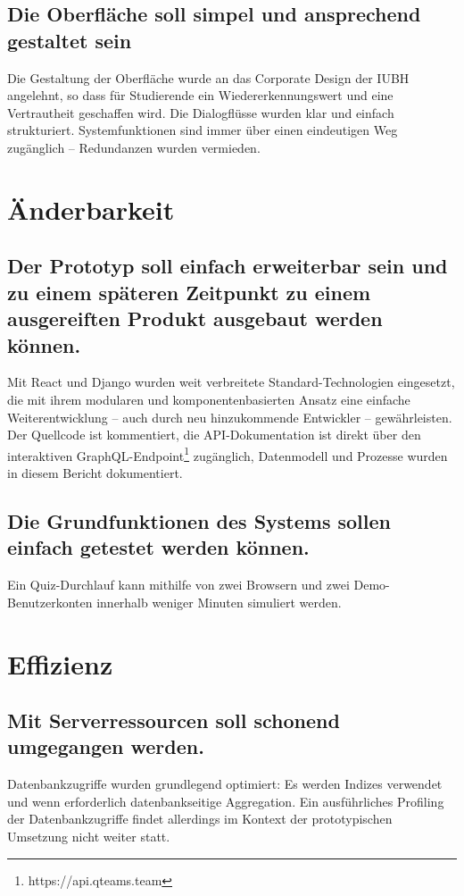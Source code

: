 \documentclass[a4paper,11pt,listof=numbered,glossary=totoc,parskip=half,toc=bib]{scrreprt}
\begin{document}
\begin{appendices}
	\subsection{Die Oberfläche soll simpel und ansprechend gestaltet sein}
		Die Gestaltung der Oberfläche wurde an das Corporate Design der IUBH angelehnt, so dass für Studierende ein Wiedererkennungswert und eine Vertrautheit geschaffen wird. Die Dialogflüsse wurden klar und einfach strukturiert. Systemfunktionen sind immer über einen eindeutigen Weg zugänglich -- Redundanzen wurden vermieden.
		
	
	\section{Änderbarkeit}
	
	\subsection{Der Prototyp soll einfach erweiterbar sein und zu einem späteren Zeitpunkt zu einem ausgereiften Produkt ausgebaut werden können.}
	Mit React und Django wurden weit verbreitete Standard-Technologien eingesetzt, die mit ihrem modularen und komponentenbasierten Ansatz eine einfache Weiterentwicklung -- auch durch neu hinzukommende Entwickler -- gewährleisten. Der Quellcode ist kommentiert, die API-Dokumentation ist direkt über den interaktiven GraphQL-Endpoint\footnote{https://api.qteams.team} zugänglich, Datenmodell und Prozesse wurden in diesem Bericht dokumentiert.
	
		\subsection{Die Grundfunktionen des Systems sollen einfach getestet werden können.}
		Ein Quiz-Durchlauf kann mithilfe von zwei Browsern und zwei Demo-Benutzerkonten innerhalb weniger Minuten simuliert werden.
		
	
	\section{Effizienz}
		\subsection{Mit Serverressourcen soll schonend umgegangen werden.}
		Datenbankzugriffe wurden grundlegend optimiert: Es werden Indizes verwendet und wenn erforderlich datenbankseitige Aggregation. Ein ausführliches Profiling der Datenbankzugriffe findet allerdings im Kontext der prototypischen Umsetzung nicht weiter statt.		
		

\end{appendices}
\end{document}
